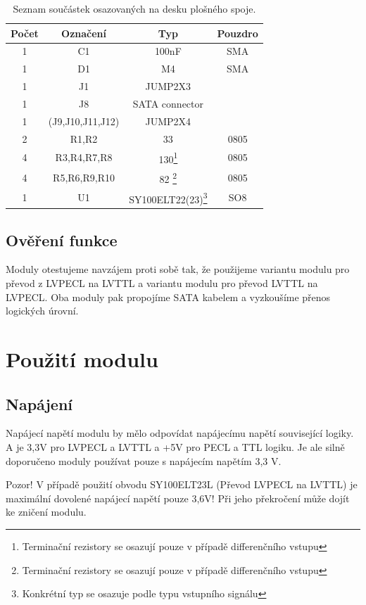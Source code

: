 \documentclass[12pt,a4paper,oneside]{article}
\begin{document}
\begin{savenotes}
\begin{table}[h!]
\begin{center}
\begin{tabular}{ |c|c|c|c| }
\hline 
Počet & Označení & Typ  & Pouzdro  \\ 
\hline 
1	&	C1	&	100nF	&	SMA \\ 
1	&	D1 	& 	M4 	& 	SMA \\ 
1	&	J1 	& JUMP2X3 &  \\ 
1	& 	J8 	& SATA connector &  \\
1	&	(J9,J10,J11,J12) & JUMP2X4 & \\
2	&	R1,R2	 & 33	& 0805\\
4	& 	R3,R4,R7,R8	&	130\footnote{Terminační rezistory se osazují pouze v případě differenčního vstupu} & 0805\\
4	&	R5,R6,R9,R10	&	82 \footnote{Terminační rezistory se osazují pouze v případě differenčního vstupu} & 0805\\
1	&	U1	&	SY100ELT22(23)\footnote{Konkrétní typ se osazuje podle typu vstupního signálu} & SO8 \\
\hline 
\end{tabular}
\end{center}
\caption{Seznam součástek osazovaných na desku plošného spoje.}
\label{seznam_soucastek_galvanic_isolation}
\end{table}
\end{savenotes}



\subsection{Ověření funkce}

Moduly otestujeme navzájem proti sobě tak, že použijeme variantu modulu pro převod z LVPECL na LVTTL a variantu modulu pro převod LVTTL na LVPECL. Oba moduly pak propojíme SATA kabelem a vyzkoušíme přenos logických úrovní. 


\section{Použití modulu}

\subsection{Napájení}

Napájecí napětí modulu by mělo odpovídat napájecímu napětí související
logiky. A je 3,3V pro LVPECL a LVTTL a +5V pro PECL a TTL logiku. Je ale silně doporučeno moduly používat pouze s napájecím napětím 3,3 V.  

Pozor! V případě použití obvodu SY100ELT23L (Převod LVPECL na LVTTL) je
maximální dovolené napájecí napětí pouze 3,6V! Při jeho překročení může dojít
ke zničení modulu.
\end{document}
